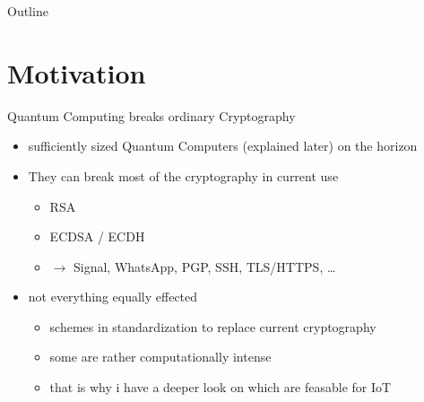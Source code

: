\documentclass[ucs,10pt]{beamer}
\begin{document}
\begin{frame}[plain]
  \titlepage
\end{frame}

\begin{frame}{Outline}
  \tableofcontents[pausesections]
\end{frame}

\section{Motivation}
\begin{frame}{Quantum Computing breaks ordinary Cryptography}
  \begin{itemize}
  \item
    sufficiently sized Quantum Computers (explained later) on the horizon
  \item
    They can break most of the cryptography in current use
    \begin{itemize}
      \item RSA
      \item ECDSA / ECDH
      \item $\rightarrow$ Signal, WhatsApp, PGP, SSH, TLS/HTTPS, \dots
    \end{itemize}
  \item 
    not everything equally effected
    \begin{itemize}
      \item schemes in standardization to replace current cryptography
      \item some are rather computationally intense
      \item that is why i have a deeper look on which are feasable for IoT
    \end{itemize}
  \end{itemize}
\end{frame}
\end{document}
